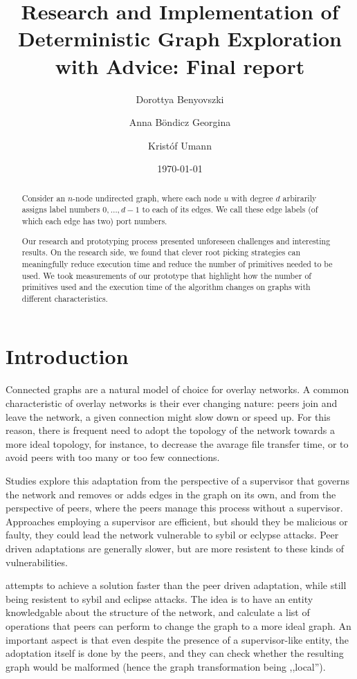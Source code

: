 \documentclass{article}
\title{Research and Implementation of Deterministic Graph Exploration with Advice: Final report}
\author[1]{Dorottya Benyovszki}
\author[1]{Anna Böndicz Georgina}
\author[1]{Kristóf Umann}
\affil[1]{Eötvös Loránd University, Faculty of Informatics}
\date{\today}
\begin{document}
\maketitle

\begin{abstract}
  Consider an $n$-node undirected graph, where each node $u$ with degree $d$ arbirarily assigns label numbers $0,\dots,d-1$ to each of its edges. We call these edge labels (of which each edge has two) port numbers.

  Our research and prototyping process presented unforeseen challenges and interesting results. On the research side, we found that clever root picking strategies can meaningfully reduce execution time and reduce the number of primitives needed to be used. We took measurements of our prototype that highlight how the number of primitives used and the execution time of the algorithm changes on graphs with different characteristics.
\end{abstract}

\section{Introduction}
\label{sec:introduction}

Connected graphs are a natural model of choice for overlay networks. A common characteristic of overlay networks is their ever changing nature: peers join and leave the network, a given connection might slow down or speed up. For this reason, there is frequent need to adopt the topology of the network towards a more ideal topology, for instance, to decrease the avarage file transfer time, or to avoid peers with too many or too few connections.

Studies explore this adaptation from the perspective of a supervisor that governs the network and removes or adds edges in the graph on its own, and from the perspective of peers, where the peers manage this process without a supervisor. Approaches employing a supervisor are efficient, but should they be malicious or faulty, they could lead the network vulnerable to sybil or eclypse attacks. Peer driven adaptations are generally slower, but are more resistent to these kinds of vulnerabilities.

\cite{ulgt} attempts to achieve a solution faster than the peer driven adaptation, while still being resistent to sybil and eclipse attacks. The idea is to have an entity knowledgable about the structure of the network, and calculate a list of operations that peers can perform to change the graph to a more ideal graph. An important aspect is that even despite the presence of a supervisor-like entity, the adoptation itself is done by the peers, and they can check whether the resulting graph would be malformed (hence the graph transformation being ,,local'').
\end{document}

